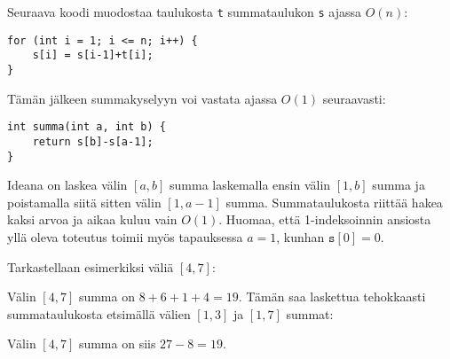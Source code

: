Seuraava koodi muodostaa taulukosta \texttt{t}
summataulukon \texttt{s} ajassa $O(n)$:

\begin{lstlisting}
for (int i = 1; i <= n; i++) {
    s[i] = s[i-1]+t[i];
}
\end{lstlisting}

Tämän jälkeen summakyselyyn voi vastata
ajassa $O(1)$ seuraavasti:

\begin{lstlisting}
int summa(int a, int b) {
    return s[b]-s[a-1];
}
\end{lstlisting}

Ideana on laskea välin $[a,b]$ summa 
laskemalla ensin välin $[1,b]$ summa
ja poistamalla siitä sitten välin $[1,a-1]$ summa.
Summataulukosta riittää hakea kaksi arvoa
ja aikaa kuluu vain $O(1)$.
Huomaa, että 1-indeksoinnin ansiosta
yllä oleva toteutus toimii myös tapauksessa $a=1$,
kunhan $\texttt{s}[0]=0$.

Tarkastellaan esimerkiksi väliä $[4,7]$:
\begin{center}
\end{center}
Välin $[4,7]$ summa on $8+6+1+4=19$.
Tämän saa laskettua tehokkaasti summataulukosta
etsimällä välien $[1,3]$ ja $[1,7]$ summat:
\begin{center}
\end{center}
Välin $[4,7]$ summa on siis $27-8=19$.

